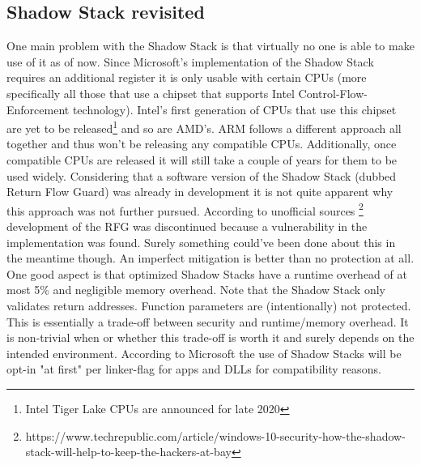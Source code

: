 \documentclass[10pt,twocolumn,a4paper]{article}
\begin{document}
\subsection{Shadow Stack revisited}
One main problem with the Shadow Stack is that virtually no one is able to make use of it as of now. Since Microsoft's implementation of the Shadow Stack requires an additional register it is only usable with certain CPUs (more specifically all those that use a chipset that supports Intel Control-Flow-Enforcement technology).
Intel's first generation of CPUs that use this chipset are yet to be released\footnote{Intel Tiger Lake CPUs are announced for late 2020} and so are AMD's.
ARM follows a different approach all together and thus won't be releasing any compatible CPUs.
Additionally, once compatible CPUs are released it will still take a couple of years for them to be used widely.
Considering that a software version of the Shadow Stack (dubbed Return Flow Guard) was already in development it is not quite apparent why this approach was not further pursued.
According to unofficial sources \footnote{https://www.techrepublic.com/article/windows-10-security-how-the-shadow-stack-will-help-to-keep-the-hackers-at-bay} development of the RFG was discontinued because a vulnerability in the implementation was found. Surely something could've been done about this in the meantime though. An imperfect mitigation is better than no protection at all.
One good aspect is that optimized Shadow Stacks have a runtime overhead of at most 5\% and negligible memory overhead.
Note that the Shadow Stack only validates return addresses. Function parameters are (intentionally) not protected. This is essentially a trade-off between security and runtime/memory overhead. It is non-trivial when or whether this trade-off is worth it and surely depends on the intended environment.
According to Microsoft the use of Shadow Stacks will be opt-in "at first" per linker-flag for apps and DLLs for compatibility reasons.
\end{document}
